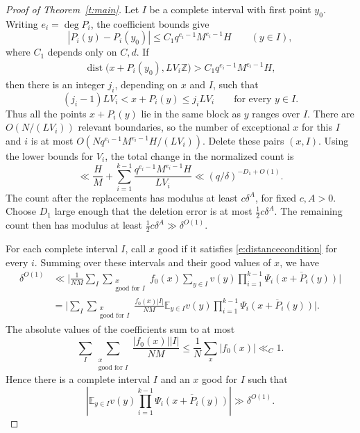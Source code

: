 \documentclass[12pt]{amsart}
\newcommand{\1}{\mathbf 1}
\theoremstyle{definition}
\begin{document}
\begin{proof}[Proof of Theorem~\ref{t:main}]
Let $I$ be a complete interval with first point $y_0$. Writing
$e_i=\deg P_i$, the coefficient bounds give
\[
 |P_i(y)-P_i(y_0)|
 \leq C_1q^{e_i-1}M^{e_i-1}H
 \qquad (y\in I),
\]
where $C_1$ depends only on $C,d$. If
\begin{align}\label{e:distancecondition}
    \operatorname{dist} \bigl(x+P_i(y_0),LV_i\mathbb Z\bigr)
 >C_1q^{e_i-1}M^{e_i-1}H,
\end{align}
then there is an integer $j_i$, depending on $x$ and $I$, such that
\[
 (j_i-1)LV_i<x+P_i(y)\leq j_iLV_i
 \qquad\text{for every }y\in I.
\]
Thus all the points $x+P_i(y)$ lie in the same block as $y$ ranges
over $I$.
There are $O(N/(LV_i))$ relevant boundaries, so the number of
exceptional $x$ for this $I$ and $i$ is at most
$O(Nq^{e_i-1}M^{e_i-1}H/(LV_i))$. Delete these pairs $(x,I)$.
Using the lower bounds for $V_i$, the total change in the
normalized count is
\[
 \ll \frac HM+
       \sum_{i=1}^{k-1}
       \frac{q^{e_i-1}M^{e_i-1}H}{LV_i}
 \ll (q/\delta)^{-D_1+O(1)}.
\]
The count after the replacements has modulus at least
$c\delta^A$, for fixed $c,A>0$. Choose $D_1$ large enough
that the deletion error is at most $\frac12c\delta^A$.
The remaining count then has modulus at least
$\frac12c\delta^A\gg\delta^{O(1)}$.

For each complete interval \(I\), call \(x\) good if it satisfies \eqref{e:distancecondition}
for every \(i\). Summing over these
intervals and their good values of \(x\), we have
\[
\begin{aligned}
 \delta^{O(1)}
 &\ll \Big|
 \frac1{NM}\sum_I\sum_{\substack{x\\\text{good for }I}}
 f_0(x)\sum_{y\in I}v(y)
 \prod_{i=1}^{k-1}\overline{\Psi_i(x+P_i(y))}
 \Big|\\
 &=\Big|
 \sum_I\sum_{\substack{x\\\text{good for }I}}
 \frac{f_0(x)|I|}{NM}
 \mathbb E_{y\in I}v(y)
 \prod_{i=1}^{k-1}\overline{\Psi_i(x+P_i(y))}
 \Big|.
\end{aligned}
\]
The absolute values of the coefficients sum to at most
\[
 \sum_I\sum_{\substack{x\\\text{good for }I}}
 \frac{|f_0(x)||I|}{NM}
 \leq\frac1N\sum_x|f_0(x)|\ll_C1.
\]
Hence there is a complete interval \(I\) and an \(x\) good for
\(I\) such that
\[
 \left|\mathbb E_{y\in I}v(y)
 \prod_{i=1}^{k-1}\overline{\Psi_i(x+P_i(y))}\right|
 \gg\delta^{O(1)}.
\]


\end{proof}
\end{document}

